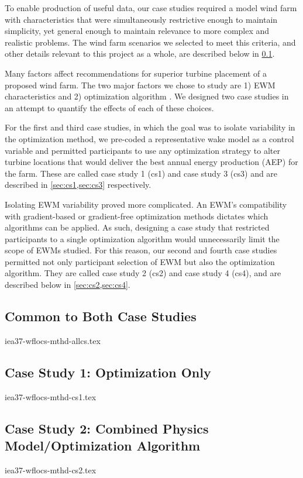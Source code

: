 
To enable production of useful data, our case studies required a model wind farm with characteristics that were simultaneously restrictive enough to maintain simplicity, yet general enough to maintain relevance to more complex and realistic problems.
The wind farm scenarios we selected to meet this criteria, and other details relevant to this project as a whole, are described below in \cref{sec:windfarm}.

Many factors affect recommendations for superior turbine placement of a proposed wind farm.
The two major factors we chose to study are
1) EWM characteristics and 2) optimization algorithm \cite{HerbertAcero2014}.
We designed two case studies in an attempt to quantify the effects of each of these choices.

For the first and third case studies, in which the goal was to isolate variability in the optimization method, we pre-coded a representative wake model as a control variable
and permitted participants to use any optimization strategy to alter turbine locations that would deliver the best annual energy production (AEP) for the farm.
These are called case study 1 (cs1) and case study 3 (cs3) and are described in \cref{sec:cs1,sec:cs3} respectively.

Isolating EWM variability proved more complicated.
An EWM's compatibility with gradient-based or gradient-free optimization methods dictates which algorithms can be applied.
As such, designing a case study that restricted participants to a single optimization algorithm would unnecessarily limit the scope of EWMs studied.
For this reason, our second and fourth case studies permitted not only participant selection of EWM but also the optimization algorithm.
They are called case study 2 (cs2) and case study 4 (cs4), and are described below in \cref{sec:cs2,sec:cs4}.

\bigskip
\subsection{Common to Both Case Studies} \label{sec:windfarm}

	{iea37-wflocs-mthd-allcs.tex}
	
\subsection{Case Study 1: Optimization Only} \label{sec:cs1}

	{iea37-wflocs-mthd-cs1.tex}

\subsection{Case Study 2: Combined Physics Model/Optimization Algorithm} \label{sec:cs2}

	{iea37-wflocs-mthd-cs2.tex}
